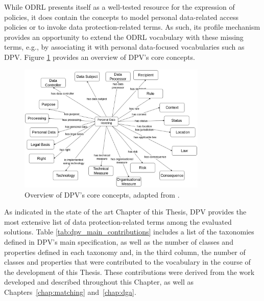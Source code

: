 While ODRL presents itself as a well-tested resource for the expression of policies, it does contain the concepts to model personal data-related access policies or to invoke data protection-related terms.
As such, its profile mechanism provides an opportunity to extend the ODRL vocabulary with these missing terms, e.g., by associating it with personal data-focused vocabularies such as DPV.
Figure \ref{fig:dpv_base} provides an overview of DPV's core concepts.

\begin{figure}[htbp]
\centering
\includegraphics[width=0.8\textwidth]{figures/chapter-4/dpv-base.png}
\caption[Overview of DPV's core concepts.]{Overview of DPV's core concepts, adapted from \cite{pandit_primer_2022}.}
\label{fig:dpv_base}
\end{figure}

As indicated in the state of the art Chapter of this Thesis, DPV provides the most extensive list of data protection-related terms among the evaluated solutions.
Table \ref{tab:dpv_main_contributions} includes a list of the taxonomies defined in DPV's main specification, as well as the number of classes and properties defined in each taxonomy and, in the third column, the number of classes and properties that were contributed to the vocabulary in the course of the development of this Thesis.
These contributions were derived from the work developed and described throughout this Chapter, as well as Chapters~\ref{chap:matching} and~\ref{chap:dga}.

